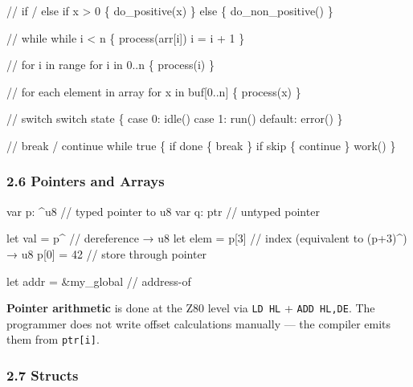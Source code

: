 \documentclass[
  11pt,
]{article}
\newenvironment{Shaded}{\begin{snugshade}}{\end{snugshade}}
\newcommand{\NormalTok}[1]{#1}
\begin{document}
\begin{Shaded}
\begin{Highlighting}[]
\NormalTok{// if / else}
\NormalTok{if x \textgreater{} 0 \{}
\NormalTok{    do\_positive(x)}
\NormalTok{\} else \{}
\NormalTok{    do\_non\_positive()}
\NormalTok{\}}

\NormalTok{// while}
\NormalTok{while i \textless{} n \{}
\NormalTok{    process(arr[i])}
\NormalTok{    i = i + 1}
\NormalTok{\}}

\NormalTok{// for i in range}
\NormalTok{for i in 0..n \{}
\NormalTok{    process(i)}
\NormalTok{\}}

\NormalTok{// for each element in array}
\NormalTok{for x in buf[0..n] \{}
\NormalTok{    process(x)}
\NormalTok{\}}

\NormalTok{// switch}
\NormalTok{switch state \{}
\NormalTok{    case 0: idle()}
\NormalTok{    case 1: run()}
\NormalTok{    default: error()}
\NormalTok{\}}

\NormalTok{// break / continue}
\NormalTok{while true \{}
\NormalTok{    if done \{ break \}}
\NormalTok{    if skip \{ continue \}}
\NormalTok{    work()}
\NormalTok{\}}
\end{Highlighting}
\end{Shaded}

\hypertarget{pointers-and-arrays}{%
\subsubsection{2.6 Pointers and Arrays}\label{pointers-and-arrays}}

\begin{Shaded}
\begin{Highlighting}[]
\NormalTok{var p: \^{}u8              // typed pointer to u8}
\NormalTok{var q: ptr              // untyped pointer}

\NormalTok{let val = p\^{}            // dereference → u8}
\NormalTok{let elem = p[3]         // index (equivalent to (p+3)\^{}) → u8}
\NormalTok{p[0] = 42               // store through pointer}

\NormalTok{let addr = \&my\_global   // address{-}of}
\end{Highlighting}
\end{Shaded}

\textbf{Pointer arithmetic} is done at the Z80 level via \texttt{LD\ HL}
+ \texttt{ADD\ HL,DE}. The programmer does not write offset calculations
manually --- the compiler emits them from \texttt{ptr{[}i{]}}.

\hypertarget{structs}{%
\subsubsection{2.7 Structs}\label{structs}}
\end{document}
